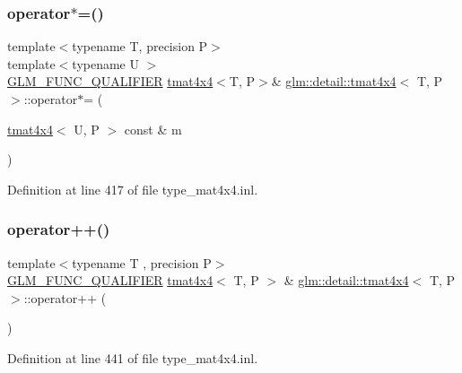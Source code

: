 \subsubsection{\texorpdfstring{operator$\ast$=()}{operator*=()}\hspace{0.1cm}{\footnotesize\ttfamily [4/4]}}
{\footnotesize\ttfamily template$<$typename T, precision P$>$ \\
template$<$typename U $>$ \\
\hyperlink{setup_8hpp_a33fdea6f91c5f834105f7415e2a64407}{G\+L\+M\+\_\+\+F\+U\+N\+C\+\_\+\+Q\+U\+A\+L\+I\+F\+I\+ER} \hyperlink{structglm_1_1detail_1_1tmat4x4}{tmat4x4}$<$T, P$>$\& \hyperlink{structglm_1_1detail_1_1tmat4x4}{glm\+::detail\+::tmat4x4}$<$ T, P $>$\+::operator$\ast$= (\begin{DoxyParamCaption}\item[{\hyperlink{structglm_1_1detail_1_1tmat4x4}{tmat4x4}$<$ U, P $>$ const \&}]{m }\end{DoxyParamCaption})}



Definition at line 417 of file type\+\_\+mat4x4.\+inl.

\mbox{\label{structglm_1_1detail_1_1tmat4x4_a4d6675dbac8dc446236babedc6c2642c}} 
\subsubsection{\texorpdfstring{operator++()}{operator++()}\hspace{0.1cm}{\footnotesize\ttfamily [1/2]}}
{\footnotesize\ttfamily template$<$typename T , precision P$>$ \\
\hyperlink{setup_8hpp_a33fdea6f91c5f834105f7415e2a64407}{G\+L\+M\+\_\+\+F\+U\+N\+C\+\_\+\+Q\+U\+A\+L\+I\+F\+I\+ER} \hyperlink{structglm_1_1detail_1_1tmat4x4}{tmat4x4}$<$ T, P $>$ \& \hyperlink{structglm_1_1detail_1_1tmat4x4}{glm\+::detail\+::tmat4x4}$<$ T, P $>$\+::operator++ (\begin{DoxyParamCaption}{ }\end{DoxyParamCaption})}



Definition at line 441 of file type\+\_\+mat4x4.\+inl.

\mbox{\label{structglm_1_1detail_1_1tmat4x4_afa478e500f09b50da702a53b3f788c0d}} 
